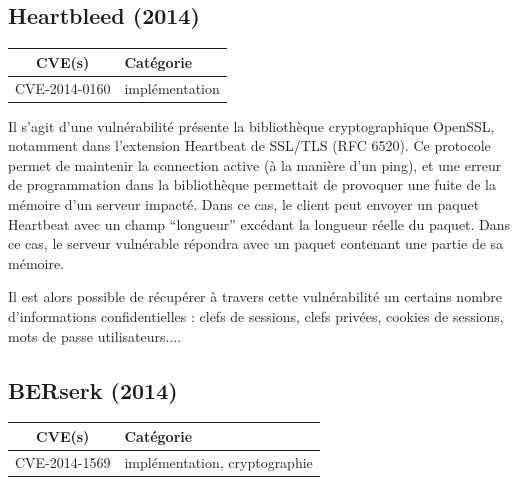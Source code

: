 

\subsection{Heartbleed (2014)}

\begin{tabularx}{0.96\textwidth}{|c|X|}
  \hline
  \textbf{CVE(s)} & \textbf{Catégorie} \\
  \hline
  CVE-2014-0160 & implémentation \\
  \hline
\end{tabularx}

\vspace{1em}

Il s'agit d'une vulnérabilité présente la bibliothèque cryptographique OpenSSL, notamment dans l'extension Heartbeat de SSL/TLS (RFC 6520). Ce protocole permet de maintenir la connection active (à la manière d'un ping), et une erreur de programmation dans la bibliothèque permettait de provoquer une fuite de la mémoire d'un serveur impacté. Dans ce cas, le client peut envoyer un paquet Heartbeat avec un champ ``longueur'' excédant la longueur réelle du paquet. Dans ce cas, le serveur vulnérable répondra avec un paquet contenant une partie de sa mémoire.

Il est alors possible de récupérer à travers cette vulnérabilité un certains nombre d'informations confidentielles : clefs de sessions, clefs privées, cookies de sessions, mots de passe utilisateurs...\cite{heartbleed}.




\subsection{BERserk (2014)}

\begin{tabularx}{0.96\textwidth}{|c|X|}
  \hline
  \textbf{CVE(s)} & \textbf{Catégorie} \\
  \hline
  CVE-2014-1569 & implémentation, cryptographie \\
  \hline
\end{tabularx}

\vspace{1em}

